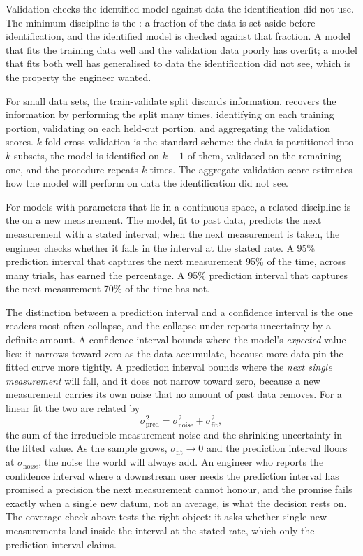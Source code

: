 Validation checks the identified model against data the
identification did not use. The minimum discipline is the
: a fraction of the data is set aside
before identification, and the identified model is checked against
that fraction. A model that fits the training data well and the
validation data poorly has overfit; a model that fits both well has
generalised to data the identification did not see, which is the
property the engineer wanted.

For small data sets, the train-validate split discards information.
 recovers the information by performing
the split many times, identifying on each training portion,
validating on each held-out portion, and aggregating the validation
scores. $k$-fold cross-validation is the standard scheme: the data
is partitioned into $k$ subsets, the model is identified on $k - 1$
of them, validated on the remaining one, and the procedure repeats
$k$ times. The aggregate validation score estimates how the model
will perform on data the identification did not see.

For models with parameters that lie in a continuous space, a
related discipline is the  on a
new measurement. The model, fit to past data, predicts the next
measurement with a stated interval; when the next measurement is
taken, the engineer checks whether it falls in the interval at
the stated rate. A 95\% prediction interval that captures the
next measurement 95\% of the time, across many trials, has earned
the percentage. A 95\% prediction interval that captures the
next measurement 70\% of the time has not.

The distinction between a prediction interval and a confidence
interval is the one readers most often collapse, and the collapse
under-reports uncertainty by a definite amount. A confidence
interval bounds where the model's \emph{expected} value lies: it
narrows toward zero as the data accumulate, because more data pin
the fitted curve more tightly. A prediction interval bounds where
the \emph{next single measurement} will fall, and it does not
narrow toward zero, because a new measurement carries its own noise
that no amount of past data removes. For a linear fit the two are
related by
\[
\sigma_{\text{pred}}^2 = \sigma_{\text{noise}}^2
  + \sigma_{\text{fit}}^2,
\]
the sum of the irreducible measurement noise and the shrinking
uncertainty in the fitted value. As the sample grows,
$\sigma_{\text{fit}} \to 0$ and the prediction interval floors at
$\sigma_{\text{noise}}$, the noise the world will always add. An
engineer who reports the confidence interval where a downstream user
needs the prediction interval has promised a precision the next
measurement cannot honour, and the promise fails exactly when a
single new datum, not an average, is what the decision rests on. The
coverage check above tests the right object: it asks whether single
new measurements land inside the interval at the stated rate, which
only the prediction interval claims.

